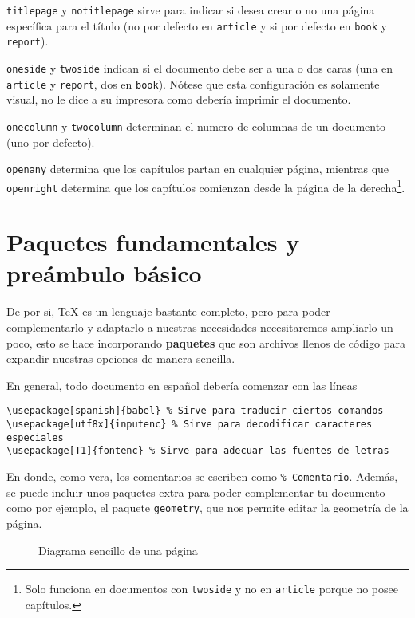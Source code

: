 \documentclass[11pt,oneside,letterpaper]{book}
\theoremstyle{custom}
\theoremstyle{definition}
\begin{document}
\texttt{titlepage} y \texttt{notitlepage} sirve para indicar si desea crear o no una página específica para el título (no por defecto en \texttt{article} y si por defecto en \texttt{book} y \texttt{report}).

\texttt{oneside} y \texttt{twoside} indican si el documento debe ser a una o dos caras (una en \texttt{article} y \texttt{report}, dos en \texttt{book}). Nótese que esta configuración es solamente visual, no le dice a su impresora como debería imprimir el documento.

\texttt{onecolumn} y \texttt{twocolumn} determinan el numero de columnas de un documento (uno por defecto).

\texttt{openany} determina que los capítulos partan en cualquier página, mientras que \texttt{openright} determina que los capítulos comienzan desde la página de la derecha\footnote{Solo funciona en documentos con \texttt{twoside} y no en \texttt{article} porque no posee capítulos.}.

\section{Paquetes fundamentales y preámbulo básico}
De por si, \TeX{} es un lenguaje bastante completo, pero para poder complementarlo y adaptarlo a nuestras necesidades necesitaremos ampliarlo un poco, esto se hace incorporando \textbf{paquetes} que son archivos llenos de código para expandir nuestras opciones de manera sencilla.

En general, todo documento en español debería comenzar con las líneas
\begin{lstlisting}
\usepackage[spanish]{babel} % Sirve para traducir ciertos comandos
\usepackage[utf8x]{inputenc} % Sirve para decodificar caracteres especiales
\usepackage[T1]{fontenc} % Sirve para adecuar las fuentes de letras
\end{lstlisting}
En donde, como vera, los comentarios se escriben como \lstinline|% Comentario|. Además, se puede incluir unos paquetes extra para poder complementar tu documento como por ejemplo, el paquete \texttt{geometry}, que nos permite editar la geometría de la página.
\begin{figure}[!ht]
\centering
{}
\caption{Diagrama sencillo de una página}
\end{figure}
\end{document}
